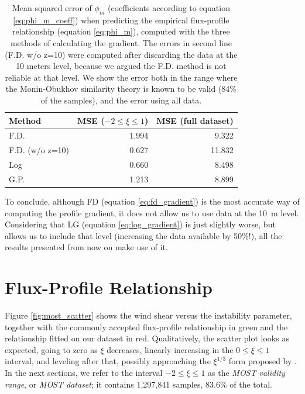 \documentclass[a4paper]{book}
\begin{document}
\begin{table}[]
\centering
\caption{Mean squared error of $\phi_m$ (coefficients according to equation \ref{eq:phi_m_coeff}) when predicting the empirical flux-profile relationship (equation \ref{eq:phi_m}), computed with the three methods of calculating the gradient. The errors in second line (F.D. w/o z=10) were computed after discarding the data at the 10 meters level, because we argued the F.D. method is not reliable at that level. We show the error both in the range where the Monin-Obukhov similarity theory is known to be valid (84\% of the samples), and the error using all data.}
\label{tbl:gradient_errors}
\begin{tabular}{l|r|r}
\toprule
Method & MSE ($-2\leq\xi\leq1$) & MSE (full dataset) \\ \midrule
F.D. & 1.994 & 9.322 \\
F.D. (w/o z=10) & 0.627  & 11.832 \\
Log & 0.660 & 8.498 \\
G.P. & 1.213 & 8.899 \\
\bottomrule
\end{tabular}
\end{table}

To conclude, although FD (equation \ref{eq:fd_gradient}) is the most accurate way of computing the profile gradient, it does not allow us to use data at the \SI{10}{\meter} level. Considering that LG (equation \ref{eq:log_gradient}) is just slightly worse, but allows us to include that level (increasing the data available by 50\%!), all the results presented from now on make use of it.


\section{Flux-Profile Relationship}
\label{sec:most_res}
Figure \ref{fig:most_scatter} shows the wind shear versus the instability parameter, together with the commonly accepted flux-profile relationship in green and the relationship fitted on our dataset in red. Qualitatively, the scatter plot looks as expected, going to zero as $\xi$ decreases, linearly increasing in the $0\leq\xi\leq1$ interval, and leveling after that, possibly approaching the $\xi^{1/3}$ form proposed by \cite{sheba_phim}. In the next sections, we refer to the interval $-2\leq\xi\leq1$ as the \emph{MOST validity range}, or \emph{MOST dataset}; it contains 1,297,841 samples, 83.6\% of the total.
\end{document}
